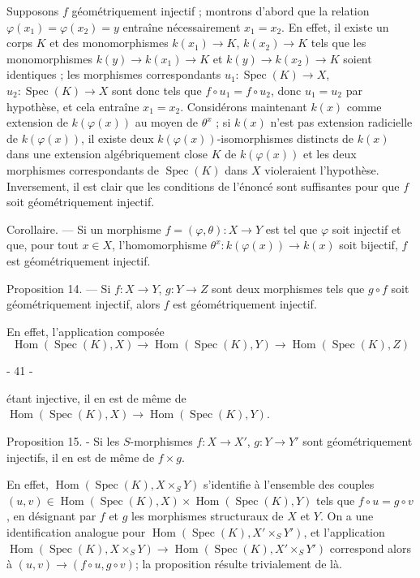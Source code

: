Supposons $f$ géométriquement injectif ; montrons d'abord que la relation $\varphi(x_1) = \varphi(x_2) = y$ entraîne nécessairement $x_1 = x_2$. En effet, il existe un corps $K$ et des monomorphismes $k(x_1) \to K$, $k(x_2) \to K$ tels que les monomorphismes $k(y) \to k(x_1) \to K$ et $k(y) \to k(x_2) \to K$ soient identiques ; les morphismes correspondants $u_1 : \operatorname{Spec}(K) \to X$, $u_2 : \operatorname{Spec}(K) \to X$ sont donc tels que $f \circ u_1 = f \circ u_2$, donc $u_1 = u_2$ par hypothèse, et cela entraîne $x_1 = x_2$. Considérons maintenant $k(x)$ comme extension de $k(\varphi(x))$ au moyen de $\theta^x$ ; si $k(x)$ n'est pas extension radicielle de $k(\varphi(x))$, il existe deux $k(\varphi(x))$-isomorphismes distincts de $k(x)$ dans une extension algébriquement close $K$ de $k(\varphi(x))$ et les deux morphismes correspondants de $\operatorname{Spec}(K)$ dans $X$ violeraient l'hypothèse. Inversement, il est clair que les conditions de l'énoncé sont suffisantes pour que $f$ soit géométriquement injectif.

Corollaire. — Si un morphisme $f = (\varphi, \theta) : X \to Y$ est tel que $\varphi$ soit injectif et que, pour tout $x \in X$, l'homomorphisme $\theta^x : k(\varphi(x)) \to k(x)$ soit bijectif, $f$ est géométriquement injectif.

Proposition 14. — Si $f : X \to Y$, $g : Y \to Z$ sont deux morphismes tels que $g \circ f$ soit géométriquement injectif, alors $f$ est géométriquement injectif.

En effet, l'application composée
$$\operatorname{Hom}(\operatorname{Spec}(K), X) \to \operatorname{Hom}(\operatorname{Spec}(K), Y) \to \operatorname{Hom}(\operatorname{Spec}(K), Z)$$

\newpage


- 41 -

étant injective, il en est de même de $\operatorname{Hom}(\operatorname{Spec}(K), X) \to \operatorname{Hom}(\operatorname{Spec}(K), Y)$.

Proposition 15. - Si les $S$-morphismes $f : X \to X'$, $g : Y \to Y'$ sont géométriquement injectifs, il en est de même de $f \times g$.

En effet, $\operatorname{Hom}(\operatorname{Spec}(K), X \times_S Y)$ s'identifie à l'ensemble des couples $(u, v) \in \operatorname{Hom}(\operatorname{Spec}(K), X) \times \operatorname{Hom}(\operatorname{Spec}(K), Y)$ tels que $f \circ u = g \circ v$, en désignant par $f$ et $g$ les morphismes structuraux de $X$ et $Y$. On a une identification analogue pour $\operatorname{Hom}(\operatorname{Spec}(K), X' \times_S Y')$, et l'application $\operatorname{Hom}(\operatorname{Spec}(K), X \times_S Y) \to \operatorname{Hom}(\operatorname{Spec}(K), X' \times_S Y')$ correspond alors à $(u, v) \to (f \circ u, g \circ v)$; la proposition résulte trivialement de là.

